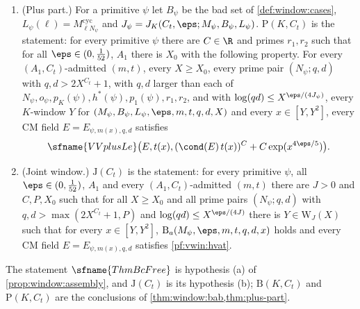 \begin{definition}
\begin{enumerate}[label=(\alph*)]
data $L(\ell)$ such that $\ell\mid m_{L(\ell)}$ and every $a\in H_{L(\ell)}$ satisfies $a\equiv1\pmod\ell$ (so that the
fields of type $L(\ell)$ contain a primitive $\ell$-th root of unity), and all $\eps\in(0,\frac1{52})$ and $A_1\in\R$,
there is $X_0$ such that for every
$(A_1,C_t)$-admitted $(m,t)$, every $X\ge X_0$ and every prime pair $(m_M;q,d)$ with $\log(qd)\le X^{\eps/(4J)}$ there is
a $K$-window $Y$.
\item\label{pf:vwin:stmt-plus} (Plus part.) For a primitive $\psi$ let $B_\psi$ be the bad set of \cref{def:window:cases},
$L_\psi(\ell)=M^{\mathrm{cyc}}_{\ell N_\psi}$ and $J_\psi=J_K(C_t,\eps;M_\psi,B_\psi,L_\psi)$. $\mathrm{P}(K,C_t)$ is the
statement: for every primitive $\psi$ there are $C\in\R$ and primes $r_1,r_2$ such that for all $\eps\in(0,\frac1{52})$,
$A_1$ there is $X_0$ with the following property. For every $(A_1,C_t)$-admitted $(m,t)$, every $X\ge X_0$, every prime pair
$(N_\psi;q,d)$ with $q,d>2X^{C_t}+1$, with $q,d$ larger than each of $N_\psi,o_\psi,p_K(\psi),h^*(\psi),p_1(\psi),r_1,r_2$,
and with $\log(qd)\le X^{\eps/(4J_\psi)}$, every $K$-window $Y$ for $(M_\psi,B_\psi,L_\psi,\eps,m,t,q,d,X)$ and every
$x\in[Y,Y^2]$, every CM field $E=E_{\psi,m(x),q,d}$ satisfies
\begin{equation}\label{pf:vwin:hvat}
\sfname{VVplusLe}\bigl(E,t(x),(\cond(E)\,t(x))^C+C\exp(x^{4\eps/5})\bigr).
\end{equation}
\item\label{pf:vwin:stmt-joint} (Joint window.) $\mathrm{J}(C_t)$ is the statement: for every primitive $\psi$, all
$\eps\in(0,\frac1{52})$, $A_1$ and every $(A_1,C_t)$-admitted $(m,t)$ there are $J>0$ and $C,P,X_0$ such that for all
$X\ge X_0$ and all prime pairs $(N_\psi;q,d)$ with $q,d>\max(2X^{C_t}+1,P)$ and $\log(qd)\le X^{\eps/(4J)}$ there is
$Y\in\mathrm{W}_J(X)$ such that for every $x\in[Y,Y^2]$, $\mathrm{B}_a(M_\psi,\eps,m,t,q,d,x)$ holds and every CM field
$E=E_{\psi,m(x),q,d}$ satisfies \eqref{pf:vwin:hvat}.
\end{enumerate}
\end{definition}

The statement $\sfname{ThmBcFree}$ is hypothesis (a) of \cref{prop:window:assembly}, and $\mathrm{J}(C_t)$ is its
hypothesis (b); $\mathrm{B}(K,C_t)$ and $\mathrm{P}(K,C_t)$ are the conclusions of \cref{thm:window:bab,thm:plus-part}.


